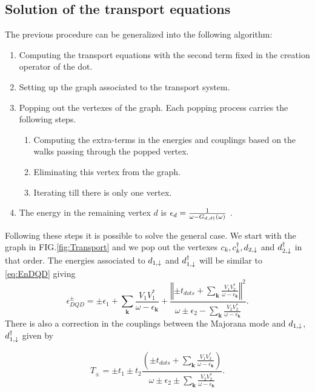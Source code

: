 \documentclass[showpacs,aps,prb,reprint,superscriptaddress]{revtex4-1}
\begin{document}
\subsection{Solution of the transport equations}

The previous procedure can be generalized into the following algorithm:

\begin{enumerate}
    \item Computing the transport equations with the second term fixed in the creation operator of the dot.
     \item  Setting up the  graph associated to the transport system.
    \item Popping out the vertexes of the graph. Each popping process carries the following steps.
    \begin{enumerate}
        \item Computing the extra-terms in the energies and couplings based on the walks passing through the popped vertex.
        \item Eliminating this vertex from the graph. 
        \item Iterating till there is only one  vertex.
        \end{enumerate}
    \item The energy in the remaining vertex $d$ is $\epsilon_d = \frac{1}{\omega -G_{d,d\dagger}(\omega)}$ .
\end{enumerate}
  


Following these steps it is possible to solve the general case.  We start with the graph in FIG.\ref{fig:Transport} and we pop out the vertexes $c_k,c^\dagger_k, d_{2,\downarrow}$ and $ d^\dagger_{2,\downarrow}$ in that order. The energies associated to $d_{1,\downarrow}$ and $d^\dagger_{1,\downarrow}$ will be similar to \eqref{eq:EnDQD} giving 
\begin{equation}
    \epsilon_{DQD}^{\pm}=\pm\epsilon_{1}+\sum_{\mathbf{k}}\frac{V_{1}V_{1}^{*}}{\omega-\epsilon_{\mathbf{k}}}+\frac{\left\Vert \pm t_{dots}+\sum_{\mathbf{k}}\frac{V_{1}V_{2}^{*}}{\omega-\epsilon_{\mathbf{k}}}\right\Vert ^{2}}{\omega\pm\epsilon_{2}-\sum_{\mathbf{k}}\frac{V_{2}V_{2}^{*}}{\omega-\epsilon_{\mathbf{k}}}}. \label{eq:epDQD}
\end{equation}
\noindent There is also a correction in the couplings between the Majorana mode and $d_{1,\downarrow}$, $d^\dagger_{1,\downarrow}$ given by 

\begin{equation}
    T_{\pm}=\pm t_{1}\pm t_{2}\frac{\left(\pm t_{dots}+\sum_{\mathbf{k}}\frac{V_{1}V_{2}^{*}}{\omega-\epsilon_{\mathbf{k}}}\right)}{\omega\pm\epsilon_{2}\pm\sum_{\mathbf{k}}\frac{V_{2}V_{2}^{*}}{\omega-\epsilon_{\mathbf{k}}}}. \label{eq:T+-}
\end{equation}
\end{document}
